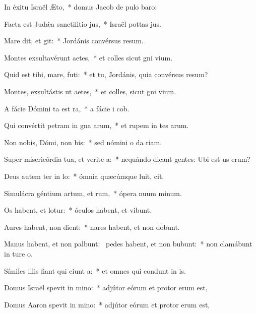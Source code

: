 \item In éxitu Israël  Æto,~* domus Jacob de pulo baro:
\item Facta est Judǽa sanctifitio jus,~* Israël pottas jus.
\item Mare dit, et git:~* Jordánis convérsus  resum.
\item Montes exsultavérunt  aetes,~* et colles sicut gni vium.
\item Quid est tibi, mare,  futi:~* et tu, Jordánis, quia convérsus  resum?
\item Montes, exsultástis ut aetes,~* et colles, sicut gni vium.
\item A fácie Dómini ta est ra,~* a fácie i cob.
\item Qui convértit petram in gna arum,~* et rupem in tes arum.
\item Non nobis, Dómi, non bis:~* sed nómini o da riam.
\item Super misericórdia tua, et verite a:~* nequándo dicant gentes: Ubi est us erum?
\item Deus autem ter in lo:~* ómnia quæcúmque luit, cit.
\item Simulácra géntium artum, et rum,~* ópera nuum minum.
\item Os habent, et  lotur:~* óculos habent, et  vibunt.
\item Aures habent,  non dient:~* nares habent, et non dobunt.
\item Manus habent, et non palbunt:~\pscross{} pedes habent, et non bubunt:~* non clamábunt in ture o.
\item Símiles illis fiant qui ciunt a:~* et omnes qui condunt in is.
\item Domus Israël spevit in mino:~* adjútor eórum et protor erum est,
\item Domus Aaron spevit in mino:~* adjútor eórum et protor erum est,
